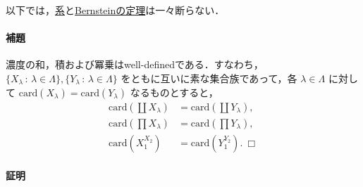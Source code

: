\documentclass[b5paper,pandoc]{bxjsarticle}
\let\oldparagraph\paragraph
\renewcommand{\paragraph}[1]{\oldparagraph{#1}\mbox{}}
\begin{document}
以下では，\protect\hyperlink{equivalence-of-existence-of-injection-and-surjection}{系}と\protect\hyperlink{bernstein-theorem}{Bernsteinの定理}は一々断らない．

\hypertarget{ux88dcux984c}{%
\paragraph{補題}\label{ux88dcux984c}}

濃度の和，積および冪乗はwell-definedである．すなわち，\(\{ X_\lambda \,:\,\lambda \in \Lambda \}, \{ Y_\lambda \,:\,\lambda \in \Lambda \}\)
をともに互いに素な集合族であって，各 \(\lambda \in \Lambda\) に対して
\(\mathrm{card}(X_\lambda) = \mathrm{card}(Y_\lambda)\)
なるものとすると， \begin{align*}
\mathrm{card}(\coprod X_\lambda) &= \mathrm{card}(\coprod Y_\lambda),\\
\mathrm{card}(\prod X_\lambda) &= \mathrm{card}(\prod Y_\lambda),\\
\mathrm{card}(X_1^{X_2}) &= \mathrm{card}(Y_1^{Y_2}).\ \Box
\end{align*}

\hypertarget{ux8a3cux660e}{%
\paragraph{証明}\label{ux8a3cux660e}}
\end{document}
